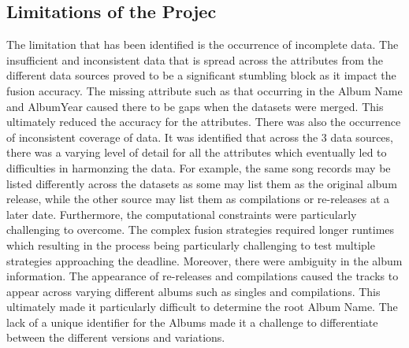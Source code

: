 \documentclass[runningheads]{llncs}
\begin{document}
\subsection{Limitations of the Projec}
The limitation that has been identified is the occurrence of incomplete data. The insufficient and inconsistent data that is spread across the attributes from the different data sources proved to be a significant stumbling block as it impact the fusion accuracy. The missing attribute such as that occurring in the Album Name and AlbumYear caused there to be gaps when the datasets were merged. This ultimately reduced the accuracy for the attributes. There was also the occurrence of inconsistent coverage of data. It was identified that across the 3 data sources, there was a varying level of detail for all the attributes which eventually led to difficulties in harmonzing the data. For example, the same song records may be listed differently across the datasets as some may list them as the original album release, while the other source may list them as compilations or re-releases at a later date. Furthermore, the computational constraints were particularly challenging to overcome. The complex fusion strategies required longer runtimes which resulting in the process being particularly challenging to test multiple strategies approaching the deadline. Moreover, there were ambiguity in the album information. The appearance of re-releases and compilations caused the tracks to appear across varying different albums such as singles and compilations. This ultimately made it particularly difficult to determine the root Album Name. The lack of a unique identifier for the Albums made it a challenge to differentiate between the different versions and variations.
\end{document}
